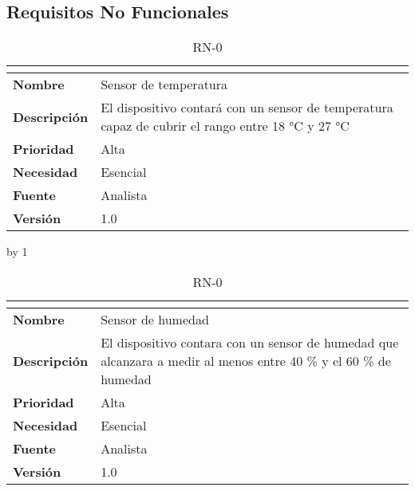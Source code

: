 \subsection{Requisitos No Funcionales}
\newcount\rn
{}
\begin{table}[H]
	\caption{RN-0\number\rn}
	\begin{tabular}{|l|p{}|}
		\hline
		\multicolumn{2}{|c|}{\cellcolor[HTML]{BFBFBF}{\color[HTML]{000000} \textbf{RN-0\number\rn}}} \\ \hline
		\textbf{Nombre}      & Sensor de temperatura                                                                            \\ \hline
		\textbf{Descripción} & El dispositivo contará con un sensor de temperatura capaz de cubrir el rango entre 18 °C y 27 °C \\ \hline
		\textbf{Prioridad}   & Alta                                                                                             \\ \hline
		\textbf{Necesidad}   & Esencial                                                                                         \\ \hline
		\textbf{Fuente}      & Analista                                                                                         \\ \hline
		\textbf{Versión}     & 1.0                                                                                              \\ \hline
	\end{tabular}
\end{table}
\advance\rn by 1
\begin{table}[H]
	\caption{RN-0\number\rn}
	\begin{tabular}{|l|p{}|}
		\hline
		\multicolumn{2}{|c|}{\cellcolor[HTML]{BFBFBF}{\color[HTML]{000000} \textbf{RN-0\number\rn}}} \\ \hline
		\textbf{Nombre}      & Sensor de humedad                                                                                                \\ \hline
		\textbf{Descripción} & El dispositivo contara con un sensor de humedad que alcanzara a medir al menos entre 40 \% y el 60 \% de humedad \\ \hline
		\textbf{Prioridad}   & Alta                                                                                                             \\ \hline
		\textbf{Necesidad}   & Esencial                                                                                                         \\ \hline
		\textbf{Fuente}      & Analista                                                                                                         \\ \hline
		\textbf{Versión}     & 1.0                                                                                                              \\ \hline
	\end{tabular}
\end{table}
